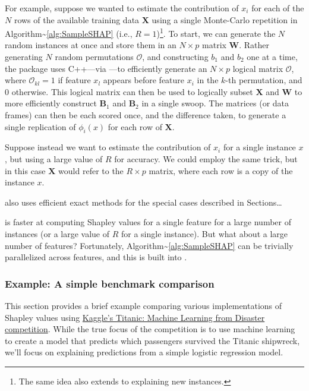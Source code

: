 For example, suppose we wanted to estimate the contribution of \(x_i\)
for each of the \(N\) rows of the available training data
\(\boldsymbol{X}\) using a single Monte-Carlo repetition in
Algorithm\textasciitilde{}\ref{alg:SampleSHAP} (i.e.,
\(R = 1\))\footnote{The same idea also extends to explaining new instances.}.
To start, we can generate the \(N\) random instances at once and store
them in an \(N \times p\) matrix \(\boldsymbol{W}\). Rather generating
\(N\) random permutations \(\mathcal{O}\), and constructing \(b_1\) and
\(b_2\) one at a time, the  package uses C++---via
 \citep{R-Rcpp}---to efficiently generate an
\(N \times p\) logical matrix \(\boldsymbol{\mathcal{O}}\), where
\(\boldsymbol{\mathcal{O}}_{kl} = 1\) if feature \(x_l\) appears before
feature \(x_i\) in the \(k\)-th permutation, and \(0\) otherwise. This
logical matrix can then be used to logically subset \(\boldsymbol{X}\)
and \(\boldsymbol{W}\) to more efficiently construct
\(\boldsymbol{B}_1\) and \(\boldsymbol{B}_2\) in a single swoop. The
matrices (or data frames) can then be each scored once, and the
difference taken, to generate a single replication of
\(\phi_i\left(x\right)\) for each row of \(\boldsymbol{X}\).

Suppose instead we want to estimate the contribution of \(x_i\) for a
single instance \(x\), but using a large value of \(R\) for accuracy. We
could employ the same trick, but in this case \(\boldsymbol{X}\) would
refer to the \(R \times p\) matrix, where each row is a copy of the
instance \(x\).

 also uses efficient exact methods for the special cases
described in Sections\ldots{}

 is faster at computing Shapley values for a single
feature for a large number of instances (or a large value of \(R\) for a
single instance). But what about a large number of features?
Fortunately, Algorithm\textasciitilde{}\ref{alg:SampleSHAP} can be
trivially parallelized across features, and this is built into
.

\hypertarget{example-a-simple-benchmark-comparison}{%
\subsubsection{Example: A simple benchmark
comparison}\label{example-a-simple-benchmark-comparison}}

This section provides a brief example comparing various implementations
of Shapley values using \href{https://www.kaggle.com/c/titanic}{Kaggle's
Titanic: Machine Learning from Disaster competition}. While the true
focus of the competition is to use machine learning to create a model
that predicts which passengers survived the Titanic shipwreck, we'll
focus on explaining predictions from a simple logistic regression model.

